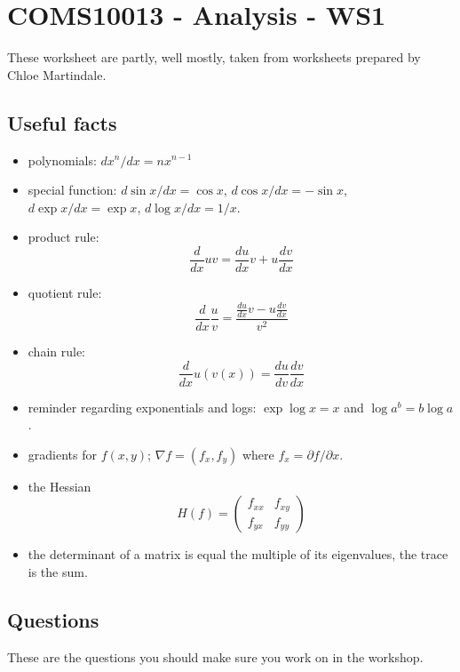 \documentclass[11pt,a4paper]{scrartcl}
\begin{document}
\section*{COMS10013 - Analysis - WS1}

These worksheet are partly, well mostly, taken from worksheets prepared by Chloe Martindale.

\subsection*{Useful facts}

\begin{itemize}

\item polynomials: $dx^n/dx=nx^{n-1}$
\item special function: $d\sin{x}/dx=\cos{x}$, $d\cos{x}/dx=-\sin{x}$, $d\exp{x}/dx=\exp{x}$, $d\log{x}/dx=1/x$.
\item product rule:
$$\frac{d}{dx}uv = \frac{du}{dx}v+u\frac{dv}{dx}$$
\item quotient rule:
$$\frac{d}{dx}\frac{u}{v}=\frac{\frac{du}{dx}v-u\frac{dv}{dx}}{v^2}$$
\item chain rule:
$$\frac{d}{dx}u(v(x))=\frac{du}{dv}\frac{dv}{dx}$$
\item reminder regarding exponentials and logs: $\exp{\log{x}}=x$ and $\log{a^b}=b\log{a}$.
\item gradients for $f(x,y)$; $\nabla{f}=(f_x,f_y)$ where $f_x=\partial f/\partial x$.
\item the Hessian
$$H(f)=\left(\begin{array}{cc}f_{xx}&f_{xy}\\f_{yx}&f_{yy}\end{array}\right)$$
\item the determinant of a matrix is equal the multiple of its eigenvalues, the trace is the sum.

\end{itemize}

\subsection*{Questions}

These are the questions you should make sure you work on in the workshop.
\end{document}

